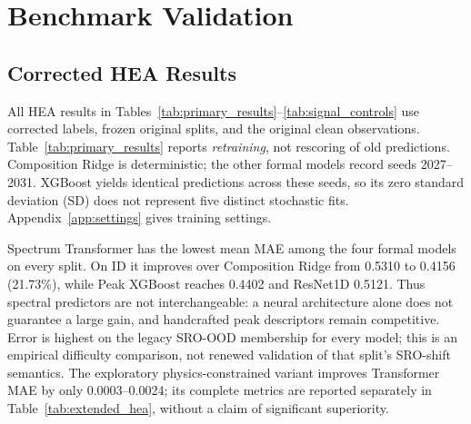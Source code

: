 \documentclass[sigconf,review,anonymous]{acmart}
\newenvironment{revision}{\ifdefined\markedcopy\color{red!70!black}\else\color{black}\fi}{}
\begin{document}
\section{Benchmark Validation}

\begin{revision}
\subsection{Corrected HEA Results}
All HEA results in Tables~\ref{tab:primary_results}--\ref{tab:signal_controls}
use corrected labels, frozen original splits, and the original clean
observations. Table~\ref{tab:primary_results} reports \emph{retraining}, not
rescoring of old predictions. Composition Ridge is deterministic; the other
formal models record seeds 2027--2031. XGBoost yields identical predictions
across these seeds, so its zero standard deviation (SD) does not represent five distinct
stochastic fits. Appendix~\ref{app:settings} gives training settings.

Spectrum Transformer has the lowest mean MAE among the four formal models
on every split. On ID it improves over Composition Ridge from 0.5310 to
0.4156 (21.73\%), while Peak XGBoost reaches 0.4402 and ResNet1D 0.5121.
Thus spectral predictors are not interchangeable: a neural architecture
alone does not guarantee a large gain, and handcrafted peak descriptors
remain competitive. Error is highest on the legacy SRO-OOD membership
for every model; this is an empirical difficulty comparison, not renewed
validation of that split's SRO-shift semantics. The exploratory
physics-constrained variant improves Transformer MAE by only
0.0003--0.0024; its complete metrics are reported separately in
Table~\ref{tab:extended_hea}, without a claim of significant superiority.

\begin{table}[t]
  \centering
  \caption{Corrected-label HEA retraining: parent-macro masked MAE
  (lower is better), mean $\pm$ seed SD. The best formal-model mean in
  each column is \textbf{bold}, the runner-up \underline{underlined}, with
  consistently ranked model names highlighted likewise; this
  denotes numerical rank, not significance. Ridge has one deterministic
  fit (no SD shown); the others record five seeds. Legacy SRO OOD
  retains the original membership but not a revalidated label-shift claim.}
  \label{tab:primary_results}
  
\end{table}


\end{revision}
\end{document}
